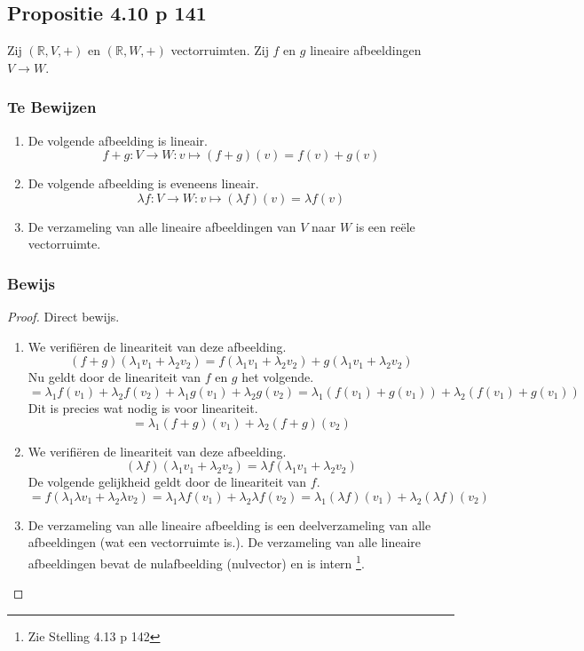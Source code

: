 \documentclass[lineaire_algebra_oplossingen.tex]{subfiles}
\begin{document}
\subsection{Propositie 4.10 p 141}
\label{4.10}
Zij $(\mathbb{R},V,+)$ en $(\mathbb{R},W,+)$ vectorruimten. Zij $f$ en $g$ lineaire afbeeldingen $V\rightarrow W$.

\subsubsection*{Te Bewijzen}
\begin{enumerate}
\item De volgende afbeelding is lineair.
\[f+g: V \rightarrow W: v\mapsto(f+g)(v)=f(v)+g(v)\]
\item De volgende afbeelding is eveneens lineair.
\[\lambda f: V\rightarrow W: v\mapsto (\lambda f)(v) = \lambda f(v)\]
\item De verzameling van alle lineaire afbeeldingen van $V$ naar $W$ is een re\"ele vectorruimte.
\end{enumerate}
\subsubsection*{Bewijs}
\begin{proof}
Direct bewijs.
\begin{enumerate}
\item
We verifi\"eren de lineariteit van deze afbeelding.
\[
(f+g)(\lambda_1v_1+\lambda_2v_2) = f(\lambda_1v_1+\lambda_2v_2) + g(\lambda_1v_1+\lambda_2v_2)
\]
Nu geldt door de lineariteit van $f$ en $g$ het volgende.
\[
= \lambda_1f(v_1)+\lambda_2f(v_2) + \lambda_1g(v_1)+\lambda_2g(v_2) = \lambda_1(f(v_1)+g(v_1)) + \lambda_2(f(v_1)+g(v_1))
\]
Dit is precies wat nodig is voor lineariteit.
\[
= \lambda_1(f+g)(v_1)+\lambda_2(f+g)(v_2)
\]

\item
We verifi\"eren de lineariteit van deze afbeelding.
\[
(\lambda f)(\lambda_1v_1+\lambda_2v_2) = \lambda f(\lambda_1v_1+\lambda_2v_2)
\]
De volgende gelijkheid geldt door de lineariteit van $f$. 
\[
=  f(\lambda_1\lambda v_1+\lambda_2\lambda v_2) = \lambda_1\lambda f(v_1)+\lambda_2\lambda f(v_2) = 
\lambda_1(\lambda f)(v_1)+\lambda_2(\lambda f)(v_2)
\]

\item
De verzameling van alle lineaire afbeelding is een deelverzameling van alle afbeeldingen (wat een vectorruimte is.). De verzameling van alle lineaire afbeeldingen bevat de nulafbeelding (nulvector) en is intern \footnote{Zie Stelling 4.13 p 142}.

\end{enumerate}
\end{proof}
\end{document}
